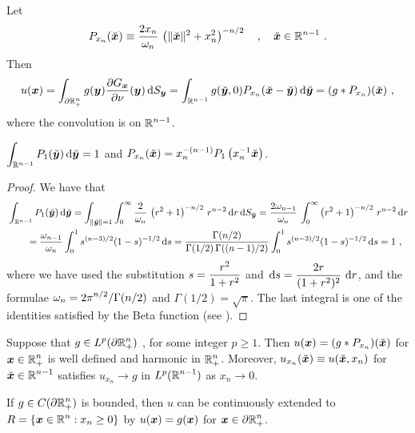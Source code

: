 Let
\[
P_{x_n}(\breve{{\bm{x}}}) \equiv \frac{2x_n}{\omega_n}\,
\left( \|\breve{{\bm{x}}}\|^2 + x_n^2 \right)^{-n/2} \quad , \quad
\breve{{\bm{x}}}\in \mathbb{R}^{n-1} \ .
\]
Then
\[
u({\bm{x}}) = \int_{\partial \mathbb{R}^n_+} g({\bm{y}})
\frac{\partial{G_{{\bm{x}}}}}{\partial \nu}({\bm{y}})\,\mathrm{d}{S}_{{\bm{y}}}
= \int_{\mathbb{R}^{n-1}} g(\breve{{\bm{y}}},0)
P_{x_n}(\breve{{\bm{x}}}-\breve{{\bm{y}}})
\,\mathrm{d}{\breve{{\bm{y}}}} = (g \ast P_{x_n})(\breve{{\bm{x}}}) \ ,
\]
where the convolution is on $\displaystyle \mathbb{R}^{n-1}$.

\begin{lemma} \label{laplace_lemma_diric}
$\displaystyle
\int_{\mathbb{R}^{n-1}} P_1(\breve{{\bm{y}}}) \,\mathrm{d}{\breve{{\bm{y}}}} = 1$ and
$\displaystyle P_{x_n}(\breve{{\bm{x}}}) = x_n^{-(n-1)}
P_1\left( x_n^{-1}\breve{{\bm{x}}}\right)$.
\end{lemma}

\begin{proof}
We have that
\begin{align*}
&\int_{\mathbb{R}^{n-1}} P_1(\breve{{\bm{y}}}) \,\mathrm{d}{\breve{{\bm{y}}}}
= \int_{\|\breve{{\bm{y}}}\|=1} \int_0^\infty 
\frac{2}{\omega_n}\,\left( r^2 + 1 \right)^{-n/2}\, r^{n-2}
\,\mathrm{d}{r}\,\mathrm{d}{S}_{\breve{{\bm{y}}}}
= \frac{2\omega_{n-1}}{\omega_n}\, \int_0^\infty 
\left( r^2 + 1 \right)^{-n/2}\, r^{n-2} \,\mathrm{d}{r} \\
&\qquad = \frac{\omega_{n-1}}{\omega_n} \int_0^1 s^{(n-3)/2} (1-s)^{-1/2} \,\mathrm{d}{s} 
= \frac{\Gamma(n/2)}{\Gamma(1/2)\,\Gamma((n-1)/2)}
\int_0^1 s^{(n-3)/2} (1-s)^{-1/2} \,\mathrm{d}{s} = 1 \ ,
\end{align*}
where we have used the substitution
$\displaystyle s = \frac{r^2}{1+r^2}$ and
$\displaystyle \,\mathrm{d}{s} = \frac{2r}{(1+r^2)^2}\, \,\mathrm{d}{r}$, and the
formulae $\displaystyle \omega_n = 2\pi^{n/2}/\Gamma(n/2)$ and
$\Gamma(1/2) = \sqrt{\pi}$.
The last integral is one of the identities satisfied by the Beta
function (see \cite{FoAC}).
\end{proof}

\begin{theorem} \label{laplace_half_plane_proof}
Suppose that $\displaystyle g \in L^p(\partial \mathbb{R}^n_+)$ \footnotemark,
for some integer $p\geq 1$.  Then
$u({\bm{x}}) = (g \ast P_{x_n})(\breve{{\bm{x}}})$ for
$\displaystyle {\bm{x}} \in \mathbb{R}^n_+$ is well defined and harmonic in
$\displaystyle \mathbb{R}^n_+$.
Moreover, $u_{x_n}(\breve{{\bm{x}}}) \equiv u(\breve{{\bm{x}}}, x_n)$ for
$\displaystyle \breve{{\bm{x}}} \in \mathbb{R}^{n-1}$ satisfies
$u_{x_n} \rightarrow g$ in
$\displaystyle L^p(\mathbb{R}^{n-1})$ as $x_n \rightarrow 0$.

If $\displaystyle g\in C(\partial \mathbb{R}^n_+)$ is bounded, then $u$ can be
continuously extended to
$\displaystyle R = \{{\bm{x}}\in \mathbb{R}^n : x_n \geq 0\}$ by
$u({\bm{x}}) = g({\bm{x}})$ for $\displaystyle {\bm{x}} \in \partial \mathbb{R}^n_+$.
\end{theorem}

